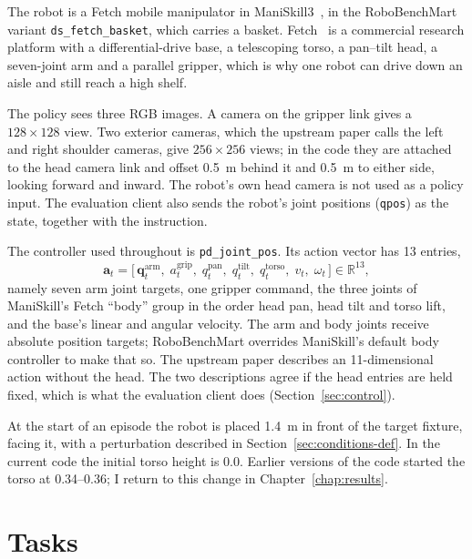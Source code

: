 The robot is a Fetch mobile manipulator in ManiSkill3~\cite{taomaniskill3}, in the RoboBenchMart variant \texttt{ds\_fetch\_basket}, which carries a basket. Fetch~\cite{wise2016fetch} is a commercial research platform with a differential-drive base, a telescoping torso, a pan--tilt head, a seven-joint arm and a parallel gripper, which is why one robot can drive down an aisle and still reach a high shelf.

The policy sees three RGB images. A camera on the gripper link gives a $128\times128$ view. Two exterior cameras, which the upstream paper calls the left and right shoulder cameras, give $256\times256$ views; in the code they are attached to the head camera link and offset 0.5~m behind it and 0.5~m to either side, looking forward and inward. The robot's own head camera is not used as a policy input. The evaluation client also sends the robot's joint positions (\texttt{qpos}) as the state, together with the instruction.

The controller used throughout is \texttt{pd\_joint\_pos}. Its action vector has 13 entries,
\begin{equation}
  \mathbf{a}_t = \big[\,\mathbf{q}^{\text{arm}}_t,\; a^{\text{grip}}_t,\; q^{\text{pan}}_t,\; q^{\text{tilt}}_t,\; q^{\text{torso}}_t,\; v_t,\; \omega_t\,\big] \in \mathbb{R}^{13},
  \label{eq:action-vector}
\end{equation}
namely seven arm joint targets, one gripper command, the three joints of ManiSkill's Fetch ``body'' group in the order head pan, head tilt and torso lift, and the base's linear and angular velocity. The arm and body joints receive absolute position targets; RoboBenchMart overrides ManiSkill's default body controller to make that so. The upstream paper describes an 11-dimensional action without the head. The two descriptions agree if the head entries are held fixed, which is what the evaluation client does (Section~\ref{sec:control}).

At the start of an episode the robot is placed 1.4~m in front of the target fixture, facing it, with a perturbation described in Section~\ref{sec:conditions-def}. In the current code the initial torso height is 0.0. Earlier versions of the code started the torso at 0.34--0.36; I return to this change in Chapter~\ref{chap:results}.

\section{Tasks}
\label{sec:tasks}


